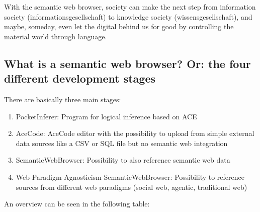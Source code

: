 \documentclass[12pt,a4paper]{article}
\begin{document}
With the semantic web browser, society can make the next step from information society (informationsgesellschaft) to knowledge society (wissensgesellschaft), and maybe, someday, even let the digital behind us for good by controlling the material world through language.

\subsection{What is a semantic web browser? Or: the four different development stages}

There are basically three main stages:

\begin{enumerate}
    \item PocketInferer: Program for logical inference based on ACE
    \item AceCode: AceCode editor with the possibility to upload from simple external data sources like a CSV or SQL file but no semantic web integration
    \item SemanticWebBrowser: Possibility to also reference semantic web data
    \item Web-Paradigm-Agnosticism SemanticWebBrowser: Possibility to reference sources from different web paradigms (social web, agentic, traditional web)
\end{enumerate}

An overview can be seen in the following table:
\end{document}
